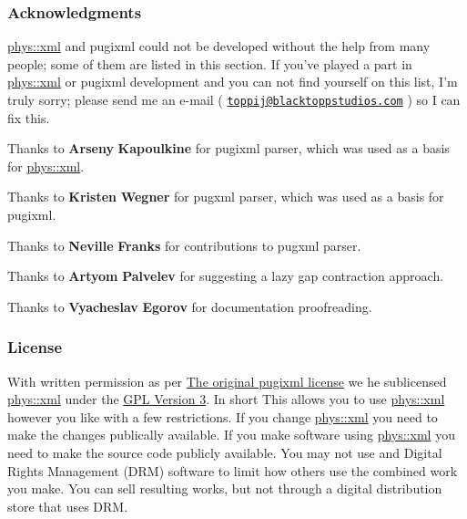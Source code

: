  \par
 \hypertarget{XMLManual_XMLAcknowledgments}{}\subsubsection{Acknowledgments}\label{XMLManual_XMLAcknowledgments}
\hyperlink{namespacephys_1_1xml}{phys::xml} and pugixml could not be developed without the help from many people; some of them are listed in this section. If you've played a part in \hyperlink{namespacephys_1_1xml}{phys::xml} or pugixml development and you can not find yourself on this list, I'm truly sorry; please send me an e-\/mail ( \href{mailto:toppij@blacktoppstudios.com}{\tt toppij@blacktoppstudios.com} ) so I can fix this. \par
 \par
 Thanks to {\bfseries Arseny} {\bfseries Kapoulkine} for pugixml parser, which was used as a basis for \hyperlink{namespacephys_1_1xml}{phys::xml}. \par
 \par
 Thanks to {\bfseries Kristen} {\bfseries Wegner} for pugxml parser, which was used as a basis for pugixml. \par
 \par
 Thanks to {\bfseries Neville} {\bfseries Franks} for contributions to pugxml parser. \par
 \par
 Thanks to {\bfseries Artyom} {\bfseries Palvelev} for suggesting a lazy gap contraction approach. \par
 \par
 Thanks to {\bfseries Vyacheslav} {\bfseries Egorov} for documentation proofreading. \par
 \par
 \hypertarget{XMLManual_XMLLicense}{}\subsubsection{License}\label{XMLManual_XMLLicense}
With written permission as per \hyperlink{OriginalpugixmlLicense}{The original pugixml license} we he sublicensed \hyperlink{namespacephys_1_1xml}{phys::xml} under the \hyperlink{GPLLicense}{GPL Version 3}. In short This allows you to use \hyperlink{namespacephys_1_1xml}{phys::xml} however you like with a few restrictions. If you change \hyperlink{namespacephys_1_1xml}{phys::xml} you need to make the changes publically available. If you make software using \hyperlink{namespacephys_1_1xml}{phys::xml} you need to make the source code publicly available. You may not use and Digital Rights Management (DRM) software to limit how others use the combined work you make. You can sell resulting works, but not through a digital distribution store that uses DRM.

